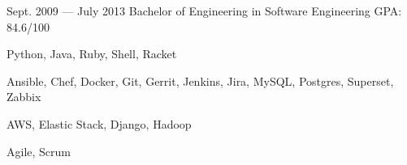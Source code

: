 \documentclass{resume}
\begin{document}
\begin{body}
	{Sept. 2009 --- July 2013}
	{Bachelor of Engineering in Software Engineering}
	{GPA: 84.6/100}
\end{body}

\smallskip


\begin{body}
\begin{description}[style=nextline,leftmargin=8em,topsep=1pt]
	\item[Languages] Python, Java, Ruby, Shell, Racket
	\item[Tools] Ansible, Chef, Docker, Git, Gerrit, Jenkins, Jira, MySQL, Postgres, Superset, Zabbix
	\item[Frameworks] AWS, Elastic Stack, Django, Hadoop
	\item[Methodologies] Agile, Scrum
\end{description}
\end{body}






%
\end{document}
